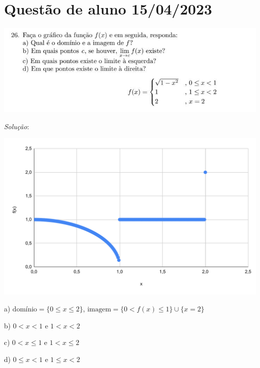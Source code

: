 \documentclass[brazilian, fleqn]{article}
\begin{document}
\section*{\centering Questão de aluno 15/04/2023}

\begin{center}
    \includegraphics[width=\textwidth]{quest-2.jpg}
\end{center}

\textit{Solução}:\\
\begin{center}
    \includegraphics[width=\textwidth]{chart (1).pdf}
\end{center}

a) \(\text{domínio} = \{0 \leq x \leq 2\}\), 
\(\text{imagem}=\{0 < f(x) \leq 1\} \cup \{x=2\}\)

b) \(0 < x < 1\) e \(1 < x < 2\)

c) \(0 < x \leq 1\) e \(1 < x \leq 2\)

d) \(0 \leq x < 1\) e \(1 \leq x < 2\)
\end{document}
